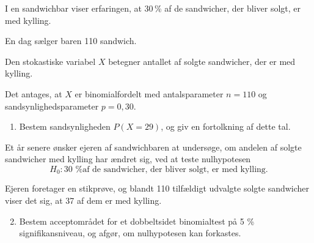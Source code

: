 \documentclass[10pt,a4paper,table]{article}
\begin{document}
I en sandwichbar viser erfaringen, at 30\,\% af de sandwicher, der bliver solgt, er med kylling.

En dag sælger baren 110 sandwich.

Den stokastiske variabel $X$ betegner antallet af solgte sandwicher, der er med kylling.

Det antages, at $X$ er binomialfordelt med antalsparameter $n=110$ og sandsynlighedsparameter $p=0,30$.

\begin{enumerate}
    \item Bestem sandsynligheden $P(X=29)$, og giv en fortolkning af dette tal.
\end{enumerate}

Et år senere ønsker ejeren af sandwichbaren at undersøge, om andelen af solgte sandwicher med kylling har ændret sig, ved at teste nulhypotesen
\[
    H_0: \text{30 \% af de sandwicher, der bliver solgt, er med kylling.}
\]

Ejeren foretager en stikprøve, og blandt 110 tilfældigt udvalgte solgte sandwicher viser det sig, at 37 af dem er med kylling.

\begin{enumerate}
    \setcounter{enumi}{1}
    \item Bestem acceptområdet for et dobbeltsidet binomialtest på 5 \% signifikansniveau, og afgør, om nulhypotesen kan forkastes.
\end{enumerate}
\end{document}
